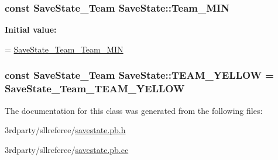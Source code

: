 \hypertarget{class_save_state_a00a41fbb76076221a5f8fb005a783c98}{
\subsubsection[{Team\-\_\-\-M\-I\-N}]{\setlength{\rightskip}{0pt plus 5cm}const {\bf Save\-State\-\_\-\-Team} Save\-State\-::\-Team\-\_\-\-M\-I\-N\hspace{0.3cm}{\ttfamily [static]}}}\label{class_save_state_a00a41fbb76076221a5f8fb005a783c98}
{\bfseries Initial value\-:}
\begin{DoxyCode}
=
    \hyperlink{savestate_8pb_8h_a49db9a7c5b207b4e5d24e034752c57eb}{SaveState\_Team\_Team\_MIN}
\end{DoxyCode}
\hypertarget{class_save_state_a72558d895179b05de4d72e793aa61d4b}{
\subsubsection[{T\-E\-A\-M\-\_\-\-Y\-E\-L\-L\-O\-W}]{\setlength{\rightskip}{0pt plus 5cm}const {\bf Save\-State\-\_\-\-Team} Save\-State\-::\-T\-E\-A\-M\-\_\-\-Y\-E\-L\-L\-O\-W = {\bf Save\-State\-\_\-\-Team\-\_\-\-T\-E\-A\-M\-\_\-\-Y\-E\-L\-L\-O\-W}\hspace{0.3cm}{\ttfamily [static]}}}\label{class_save_state_a72558d895179b05de4d72e793aa61d4b}


The documentation for this class was generated from the following files\-:\begin{DoxyCompactItemize}
\item 
3rdparty/sllreferee/\hyperlink{savestate_8pb_8h}{savestate.\-pb.\-h}\item 
3rdparty/sllreferee/\hyperlink{savestate_8pb_8cc}{savestate.\-pb.\-cc}\end{DoxyCompactItemize}

